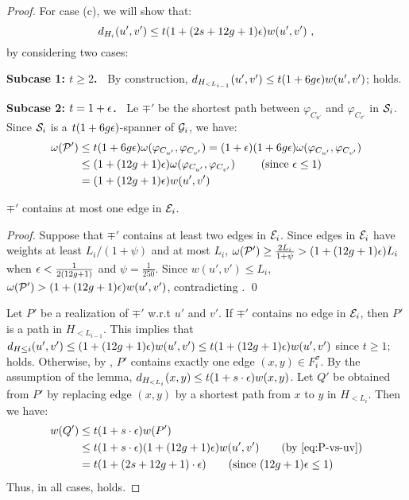 \begin{proof}
	For case (c), we will show that:
	\begin{equation}\label{eq:stretch-case-c}
		d_{H_{i}}(u',v') \leq t(1+(2s+12g+1)\epsilon)w(u',v')~,
	\end{equation}
 by considering two cases:
 
 
 
	 \noindent \textbf{Subcase 1: $t \geq 2$.~} By construction, 	$d_{H_{< L_{i-1}}}(u',v') \leq t(1+ 6g\epsilon)w(u',v')$;  holds.
	 
	 \noindent \textbf{Subcase 2: $t = 1+\epsilon$.~} Le $\mp'$ be the shortest path between $\varphi_{C_{u'}}$ and $\varphi_{C_{v'}}$ in $\mathcal{S}_i$. Since $\mathcal{S}_i$ is a $t(1+6g\epsilon)$-spanner of $\mathcal{G}_i$, we have: 
	\begin{equation} \label{eq:P-vs-uv}
		\begin{split}
					\omega(\mathcal{P}') &\leq t(1+6g\epsilon)\omega(\varphi_{C_{u'}}, \varphi_{C_{v'}}) = (1+\epsilon)(1+6g\epsilon)\omega(\varphi_{C_{u'}}, \varphi_{C_{v'}})  \\ 
					& \leq (1 + (12g+1)\epsilon)\omega(\varphi_{C_{u'}}, \varphi_{C_{v'}})  \qquad
					 \mbox{ (since $\epsilon \leq 1$)}\\
					 & = (1 + (12g+1)\epsilon)w(u',v')
		\end{split}
	\end{equation}
	
	\begin{claim}\label{clm:P-one-edge} $\mp'$ contains  at most one edge in $\mathcal{E}_i$. 
	\end{claim}
	\begin{proof} 
		Suppose that  $\mp'$ contains at least two edges in $\mathcal{E}_i$. Since edges in $\mathcal{E}_i$ have weights at least $L_i/(1+\psi)$ and at most $L_i$, $\omega(\mathcal{P}')\geq  \frac{2L_i}{1+\psi} > (1 + (12g+1)\epsilon) L_i$ when $\epsilon < \frac{1}{2(12g+1)}$ and $\psi = \frac{1}{250}$. Since $w(u',v') \leq L_i$, $\omega(\mathcal{P}') >  (1 + (12g+1)\epsilon) w(u',v')$, contradicting .  \qed
	\end{proof}
	
	Let $P'$ be a realization of $\mp'$ w.r.t $u'$ and $v'$.  If $\mp'$ contains no edge in $\mathcal{E}_i$, then $P'$ is a path in $H_{< L_{i-1}}$. This implies that $d_{H\leq i}(u',v') \leq (1 + (12g+1)\epsilon)w(u',v') \leq t(1 + (12g+1)\epsilon)w(u',v')$ since $t\geq 1$;  holds. Otherwise,  by , $P'$ contains exactly one edge $(x,y) \in F^{\sigma}_i$. By the assumption of the lemma, $d_{H_{<L_i}}(x,y) \leq t(1+s\cdot \epsilon)w(x,y)$. Let $Q'$ be obtained from $P'$ by replacing edge $(x,y)$ by a shortest path from $x$ to $y$ in $H_{<L_i}$. Then we have:
	\begin{equation*}
		\begin{split}
				w(Q') &\leq t(1+s\cdot \eps) w(P') \\ &\leq t(1+s\cdot \eps) (1 + (12g+1)\eps)w(u',v') \qquad \mbox{(by \Cref{eq:P-vs-uv})}\\
				 &= t(1+(2s+12g+1)\cdot \eps) \qquad \mbox{(since $(12g+1)\eps \leq 1$)}
		\end{split}
	\end{equation*}
	Thus, in all cases,  holds.


\end{proof}
